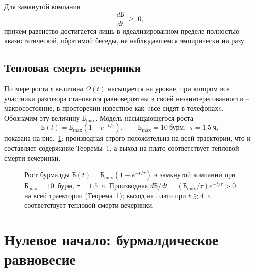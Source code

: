 \documentclass[11pt,a4paper]{article}
\newcommand{\Burm}{\text{Б}}
\begin{document}
\begin{theorem}
Для замкнутой компании
\[
\frac{d\Burm}{dt} \;\geq\; 0,
\]
причём равенство достигается лишь в идеализированном пределе полностью квазистатической, обратимой беседы, не наблюдавшемся эмпирически ни разу.
\end{theorem}

\subsection{Тепловая смерть вечеринки}

По мере роста $t$ величина $\Omega(t)$ насыщается на уровне, при котором все участники разговора становятся равновероятны в своей незаинтересованности -- макросостояние, в просторечии известное как «все сидят в телефонах». Обозначим эту величину $\Burm_{\max}$. Модель насыщающегося роста
\[
\Burm(t) = \Burm_{\max}\left(1-e^{-t/\tau}\right),\qquad \Burm_{\max}=10\ \text{бурм},\ \ \tau=1.5\ \text{ч},
\]
показана на рис.~\ref{fig:burm-time}: производная строго положительна на всей траектории, что и составляет содержание Теоремы~1, а выход на плато соответствует тепловой смерти вечеринки.

\begin{figure}[htbp]
\centering
{}
\caption{Рост бурмалды $\Burm(t)=\Burm_{\max}(1-e^{-t/\tau})$ в замкнутой компании при $\Burm_{\max}=10$~бурм, $\tau=1.5$~ч. Производная $d\Burm/dt=(\Burm_{\max}/\tau)e^{-t/\tau}>0$ на всей траектории (Теорема~1); выход на плато при $t\gtrsim4$~ч соответствует тепловой смерти вечеринки.}
\label{fig:burm-time}
\end{figure}

\section{Нулевое начало: бурмалдическое равновесие}
\end{document}
